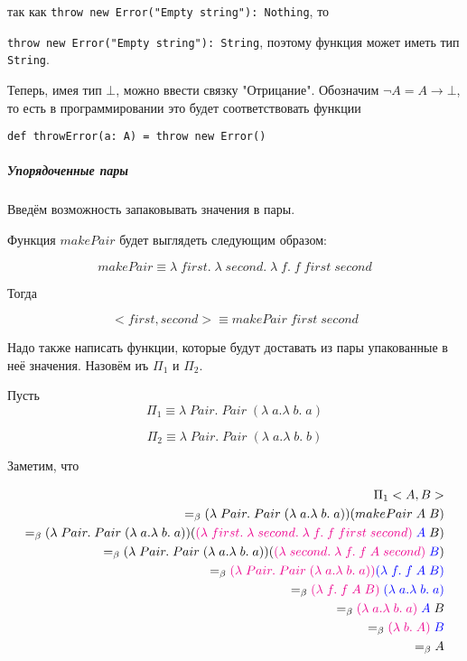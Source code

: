 так как \texttt{throw new Error("Empty string"): Nothing}, то 

\texttt{throw new Error("Empty string"): String}, поэтому функция может иметь тип \texttt{String}.

Теперь, имея тип $\bot$, можно ввести связку "Отрицание". Обозначим $\neg A = A \rightarrow \bot$, то есть в программировании это будет соответствовать функции

\begin{verbatim}
def throwError(a: A) = throw new Error()
\end{verbatim}

\subparagraph{Упорядоченные пары}

Введём возможность запаковывать значения в пары.

Функция $makePair$ будет выглядеть следующим образом:

$$makePair \equiv \lambda \; first. \; \lambda \; second. \; \lambda \; f. \; f \; first \; second$$

Тогда 

$$<first, second> \equiv makePair \; first \; second$$

Надо также написать функции, которые будут доставать из пары упакованные в неё значения. Назовём иъ $\Pi_1$ и $\Pi_2$. 

Пусть 
$$\Pi_1 \equiv \lambda \; Pair. \; Pair \; (\lambda \; a. \lambda \; b. \; a)$$

$$\Pi_2 \equiv \lambda \; Pair. \; Pair \; (\lambda \; a. \lambda \; b. \; b)$$

Заметим, что 

\begin{align*}
	\Pi_1 <A, B> \\
	=_{\beta} (\lambda \; Pair. \; Pair \; (\lambda \; a. \lambda \; b. \; a)) (makePair \; A \; B)\\ =_\beta (\lambda \; Pair. \; Pair \; (\lambda \; a. \lambda \; b. \; a)) (\textcolor{magenta}{(\lambda \; first. \; \lambda \; second. \; \lambda \; f. \; f \; first \; second)} \; \textcolor{blue}{A} \; B) \\ =_\beta (\lambda \; Pair. \; Pair \; (\lambda \; a. \lambda \; b. \; a)) (\textcolor{magenta}{(\lambda \; second. \; \lambda \; f. \; f \; A \; second)} \; \textcolor{blue}{B}) \\ =_\beta \textcolor{magenta}{(\lambda \; Pair. \; Pair \; (\lambda \; a. \lambda \; b. \; a))} \textcolor{blue}{(\lambda \; f. \; f \; A \; B)} \\ =_\beta \textcolor{magenta}{(\lambda \; f. \; f \; A \; B)} \; \textcolor{blue}{(\lambda \; a. \lambda \; b. \; a)} \\ =_\beta \textcolor{magenta}{(\lambda \; a. \lambda \; b. \; a)} \; \textcolor{blue}{A} \; B \\ =_\beta \textcolor{magenta}{(\lambda \; b. \; A)} \; \textcolor{blue}{B} \\ =_\beta A
\end{align*}

